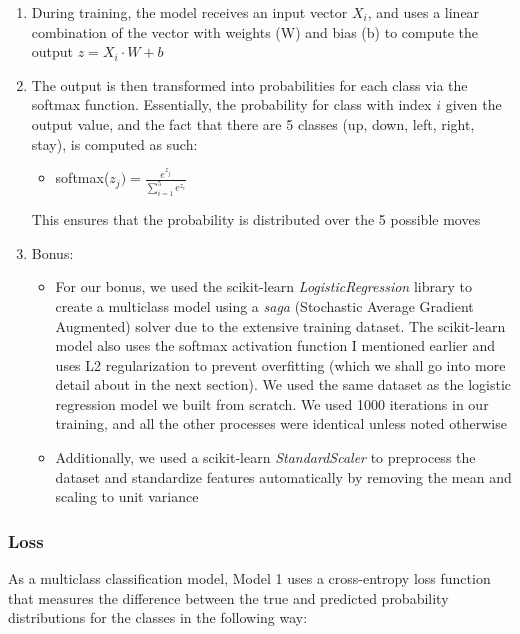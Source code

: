 \documentclass[11pt]{article}
\begin{document}
\begin{enumerate}
    \item During training, the model receives an input vector $X_i$, and uses a linear combination of the vector with weights (W) and bias (b) to compute the output $z = X_i \cdot W + b$
    \item The output is then transformed into probabilities for each class via the softmax function. Essentially, the probability for class with index $i$ given the output value, and the fact that there are 5 classes (up, down, left, right, stay), is computed as such:
    \begin{itemize}
        \item softmax($z_j) = \frac{e^{z_j}}{\sum_{i=1}^{5} e^{z_i}}$
    \end{itemize}
    This ensures that the probability is distributed over the 5 possible moves
    \item Bonus:
    \begin{itemize}
        \item For our bonus, we used the scikit-learn \emph{LogisticRegression} library to create a multiclass model using a \emph{saga} (Stochastic Average Gradient Augmented) solver due to the extensive training dataset. The scikit-learn model also uses the softmax activation function I mentioned earlier and uses L2 regularization to prevent overfitting (which we shall go into more detail about in the next section). We used the same dataset as the logistic regression model we built from scratch. We used 1000 iterations in our training, and all the other processes were identical unless noted otherwise
        \item Additionally, we used a scikit-learn \emph{StandardScaler} to preprocess the dataset and standardize features automatically by removing the mean and scaling to unit variance
    \end{itemize}
\end{enumerate}

\subsubsection{Loss}

As a multiclass classification model, Model 1 uses a cross-entropy loss function that measures the difference between the true and predicted probability distributions for the classes in the following way:
\end{document}
